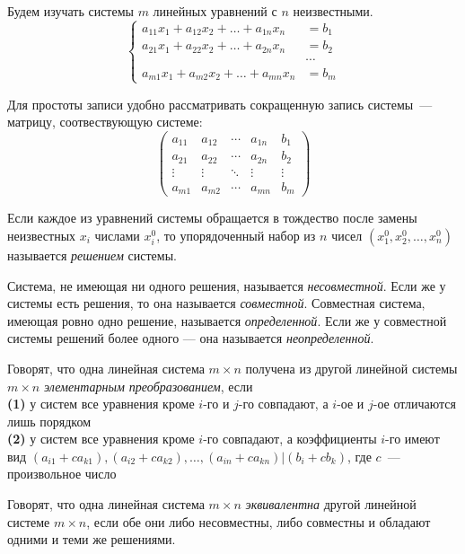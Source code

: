 %
%

Будем изучать системы $m$ линейных уравнений с $n$ неизвестными.
\[\left\{\begin{aligned}
    a_{11} x_1 + a_{12} x_2 + \dots + a_{1n} x_n
&=
    b_1
\\
    a_{21} x_1 + a_{22} x_2 + \dots + a_{2n} x_n
&=
    b_2
\\
    &\cdots
\\
    a_{m1} x_1 + a_{m2} x_2 + \dots + a_{mn} x_n
&=
    b_m
\end{aligned}\right.\]

Для простоты записи удобно рассматривать сокращенную запись системы~---
матрицу, соотвествующую системе:
\[\left(\begin{array}{cccc|c}
    a_{11} & a_{12} & \cdots & a_{1n} & b_1
\\
    a_{21} & a_{22} & \cdots & a_{2n} & b_2
\\
    \vdots & \vdots & \ddots & \vdots & \vdots
\\
    a_{m1} & a_{m2} & \cdots & a_{mn} & b_m
\end{array}\right)\]

Если каждое из уравнений системы обращается в тождество после замены
неизвестных $x_i$ числами $x_i^0$, то упорядоченный набор из $n$ чисел
$(x_1^0, x_2^0, \ldots, x_n^0)$ называется \emph{решением} системы.

Система, не имеющая ни одного решения, называется \emph{несовместной}.
Если же у системы есть решения, то она называется \emph{совместной}.
Совместная система, имеющая ровно одно решение, называется
\emph{определенной}.
Если же у совместной системы решений более одного --- она называется
\emph{неопределенной}.

Говорят, что одна линейная система $m \times n$ получена из другой линейной
системы $m \times n$ \emph{элементарным преобразованием}, если
\\\textbf{(1)}
у систем все уравнения кроме $i$-го и $j$-го совпадают, а $i$-ое и $j$-ое
отличаются лишь порядком
\\\textbf{(2)}
у систем все уравнения кроме $i$-го совпадают, а коэффициенты $i$-го имеют
вид
\(
    (a_{i1} + c a_{k1}),
    (a_{i2}+c a_{k2}),
    \ldots,
    (a_{in}+c a_{kn})
|
    (b_i+c b_k)
\),
где $c$~--- произвольное число

Говорят, что одна линейная система $m \times n$ \emph{эквивалентна} другой
линейной системе $m \times n$, если обе они либо несовместны, либо совместны и
обладают одними и теми же решениями.

